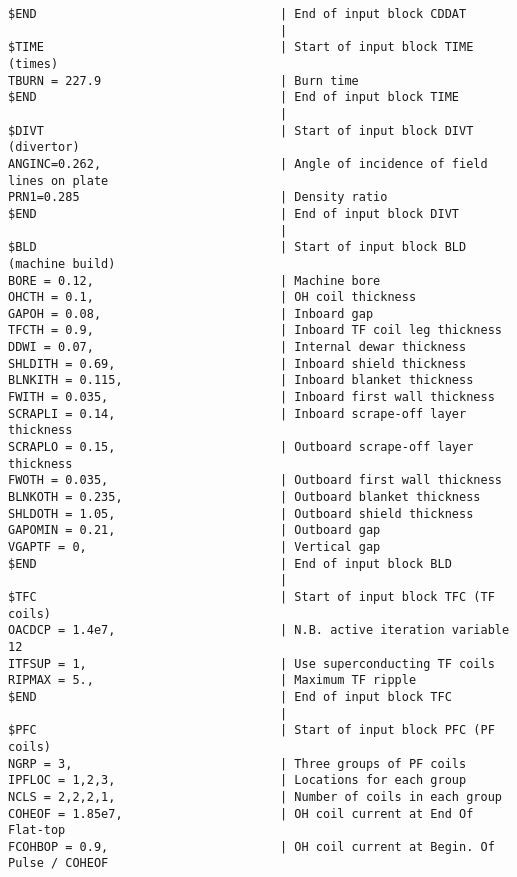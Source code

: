 \documentclass[11pt,a4paper]{report}
\begin{document}
\begin{verbatim}
$END                                  | End of input block CDDAT
                                      | 
$TIME                                 | Start of input block TIME (times)
TBURN = 227.9                         | Burn time
$END                                  | End of input block TIME
                                      | 
$DIVT                                 | Start of input block DIVT (divertor)
ANGINC=0.262,                         | Angle of incidence of field lines on plate
PRN1=0.285                            | Density ratio
$END                                  | End of input block DIVT
                                      | 
$BLD                                  | Start of input block BLD (machine build)
BORE = 0.12,                          | Machine bore
OHCTH = 0.1,                          | OH coil thickness
GAPOH = 0.08,                         | Inboard gap
TFCTH = 0.9,                          | Inboard TF coil leg thickness
DDWI = 0.07,                          | Internal dewar thickness
SHLDITH = 0.69,                       | Inboard shield thickness
BLNKITH = 0.115,                      | Inboard blanket thickness
FWITH = 0.035,                        | Inboard first wall thickness
SCRAPLI = 0.14,                       | Inboard scrape-off layer thickness
SCRAPLO = 0.15,                       | Outboard scrape-off layer thickness
FWOTH = 0.035,                        | Outboard first wall thickness
BLNKOTH = 0.235,                      | Outboard blanket thickness
SHLDOTH = 1.05,                       | Outboard shield thickness
GAPOMIN = 0.21,                       | Outboard gap
VGAPTF = 0,                           | Vertical gap
$END                                  | End of input block BLD
                                      | 
$TFC                                  | Start of input block TFC (TF coils)
OACDCP = 1.4e7,                       | N.B. active iteration variable 12
ITFSUP = 1,                           | Use superconducting TF coils
RIPMAX = 5.,                          | Maximum TF ripple
$END                                  | End of input block TFC
                                      | 
$PFC                                  | Start of input block PFC (PF coils)
NGRP = 3,                             | Three groups of PF coils
IPFLOC = 1,2,3,                       | Locations for each group
NCLS = 2,2,2,1,                       | Number of coils in each group
COHEOF = 1.85e7,                      | OH coil current at End Of Flat-top
FCOHBOP = 0.9,                        | OH coil current at Begin. Of Pulse / COHEOF

\end{verbatim}
\end{document}
